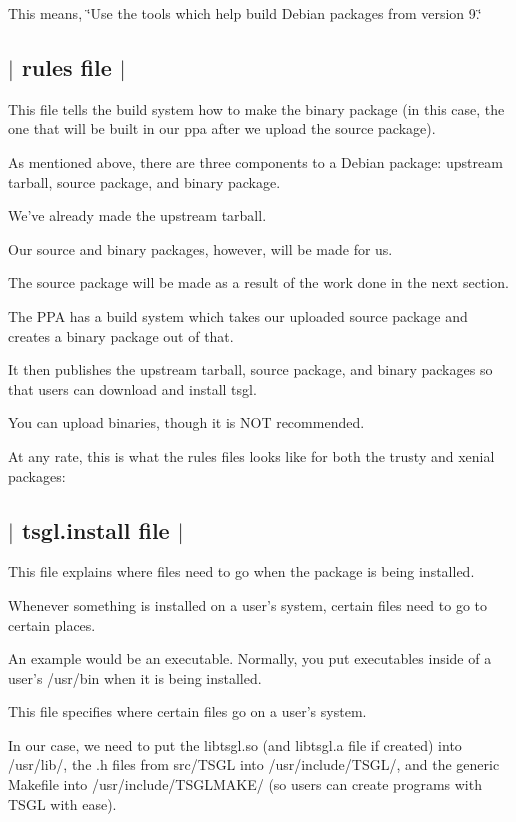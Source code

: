 This means, \char`\"{}\-Use the tools which help build Debian packages from version 9.\char`\"{} 

 \subsection*{$\vert$ rules file $\vert$ }

This file tells the build system how to make the binary package (in this case, the one that will be built in our ppa after we upload the source package).

As mentioned above, there are three components to a Debian package\-: upstream tarball, source package, and binary package.

We've already made the upstream tarball.

Our source and binary packages, however, will be made for us.

The source package will be made as a result of the work done in the next section.

The P\-P\-A has a build system which takes our uploaded source package and creates a binary package out of that.

It then publishes the upstream tarball, source package, and binary packages so that users can download and install tsgl.

You can upload binaries, though it is N\-O\-T recommended.

At any rate, this is what the rules files looks like for both the trusty and xenial packages\-:



 \subsection*{$\vert$ tsgl.\-install file $\vert$ }

This file explains where files need to go when the package is being installed.

Whenever something is installed on a user's system, certain files need to go to certain places.

An example would be an executable. Normally, you put executables inside of a user's /usr/bin when it is being installed.

This file specifies where certain files go on a user's system.

In our case, we need to put the libtsgl.\-so (and libtsgl.\-a file if created) into /usr/lib/, the .h files from src/\-T\-S\-G\-L into /usr/include/\-T\-S\-G\-L/, and the generic Makefile into /usr/include/\-T\-S\-G\-L\-M\-A\-K\-E/ (so users can create programs with T\-S\-G\-L with ease).



